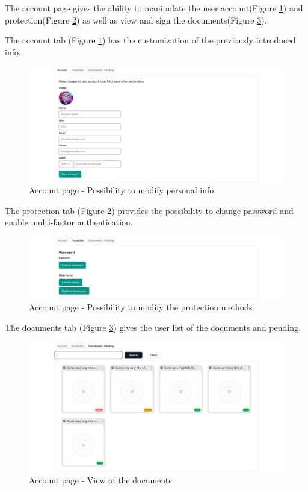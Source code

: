\newpage
The account page gives the ability to manipulate the user account(Figure \ref{accountspage-account}) and protection(Figure \ref{accountspage-protection}) as well as view and sign the documents(Figure \ref{accountspage-documents}).

The account tab (Figure \ref{accountspage-account}) has the customization of the previously introduced info.

\begin{figure}[H]
    \centering
    \includegraphics[width=18cm]{"images/figmaUI/accountspage-account-crop.png"}
    \caption{Account page - Possibility to modify personal info}
    \label{accountspage-account}
\end{figure}


The protection tab (Figure \ref{accountspage-protection}) provides the possibility to change password and enable multi-factor authentication.


\begin{figure}[H]
    \centering
    \includegraphics[width=18cm]{"images/figmaUI/accountspage-protection-crop.png"}
    \caption{Account page - Possibility to modify the protection methods}
    \label{accountspage-protection}
\end{figure}

\newpage
The documents tab (Figure \ref{accountspage-documents}) gives the user list of the documents and pending.


\begin{figure}[H]
    \centering
    \includegraphics[width=18cm]{"images/figmaUI/accountspage-documents-crop.png"}
    \caption{Account page - View of the documents}
    \label{accountspage-documents}
\end{figure}



